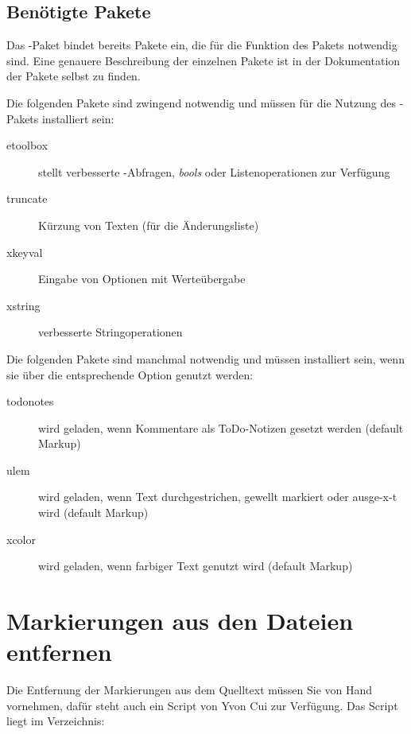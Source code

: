 

\subsection{Benötigte Pakete}
\label{sec:ui:packages}

Das -Paket bindet bereits Pakete ein, die für die Funktion des Pakets notwendig sind.
Eine genauere Beschreibung der einzelnen Pakete ist in der Dokumentation der Pakete selbst zu finden.

Die folgenden Pakete sind zwingend notwendig und müssen für die Nutzung des -Pakets installiert sein:
\begin{description}
	\item [etoolbox] stellt verbesserte -Abfragen, \emph{bools} oder Listenoperationen zur Verfügung
	\item [truncate] Kürzung von Texten (für die Änderungsliste)
	\item [xkeyval] Eingabe von Optionen mit Werteübergabe
	\item [xstring] verbesserte Stringoperationen
\end{description}

Die folgenden Pakete sind manchmal notwendig und müssen installiert sein, wenn sie über die entsprechende Option genutzt werden:
\begin{description}
	\item [todonotes] wird geladen, wenn Kommentare als ToDo-Notizen gesetzt werden (default Markup)
	\item [ulem] wird geladen, wenn Text durchgestrichen, gewellt markiert oder ausge-x-t wird (default Markup)
	\item [xcolor] wird geladen, wenn farbiger Text genutzt wird (default Markup)
\end{description}


\cleardoublepage
\section{Markierungen aus den Dateien entfernen}
\label{sec:remove-markup}

Die Entfernung der Markierungen aus dem Quelltext müssen Sie von Hand vornehmen, dafür steht auch ein Script von Yvon Cui zur Verfügung.
Das Script liegt im Verzeichnis:

